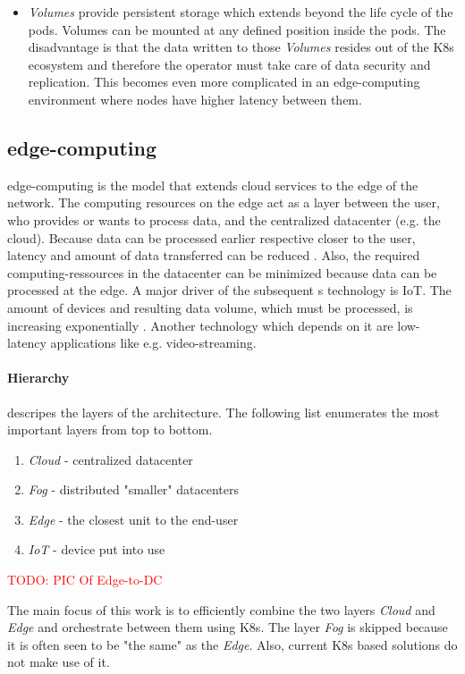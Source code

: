 \documentclass[MSC,Master,english]{twbook}%
\begin{document}
\begin{itemize}
    \item \textit{Volumes} provide persistent storage which extends beyond the life cycle of the pods. Volumes can be mounted at any defined position inside the pods. The disadvantage is that the data written to those \textit{Volumes} resides out of the \ac{K8s} ecosystem and therefore the operator must take care of data security and replication. This becomes even more complicated in an edge-computing environment where nodes have higher latency between them.
\end{itemize}

\subsection{edge-computing}
edge-computing is the model that extends cloud services to the edge of the
network. The computing resources on the edge act as a layer between the user, who provides or wants to process data, and the centralized datacenter (e.g. the cloud). Because data can be processed earlier respective closer to the user, latency and amount of data transferred can be reduced \cite{intro-edge}. Also, the required computing-ressources in the datacenter can be minimized because data can be processed at the edge. A major driver of the subsequent s technology is \ac{IoT}. The amount of devices and resulting data volume, which must be processed, is increasing exponentially \cite{SotE21}. Another technology which depends on it are low-latency applications like e.g. video-streaming. 

\paragraph{Hierarchy} descripes the layers of the architecture. The following list enumerates the most important layers from top to bottom\cite{intro-edge}.
\begin{enumerate}
    \item \textit{Cloud} - centralized datacenter
    \item \textit{Fog} - distributed "smaller" datacenters
    \item \textit{Edge} - the closest unit to the end-user
    \item \textit{\ac{IoT}} - device put into use
\end{enumerate}

\textcolor{red}{TODO: PIC Of Edge-to-DC}

The main focus of this work is to efficiently combine the two layers \textit{Cloud} and \textit{Edge} and orchestrate between them using \ac{K8s}. The layer \textit{Fog} is skipped because it is often seen to be "the same" as the \textit{Edge}. Also, current \ac{K8s} based solutions do not make use of it. 
\end{document}
